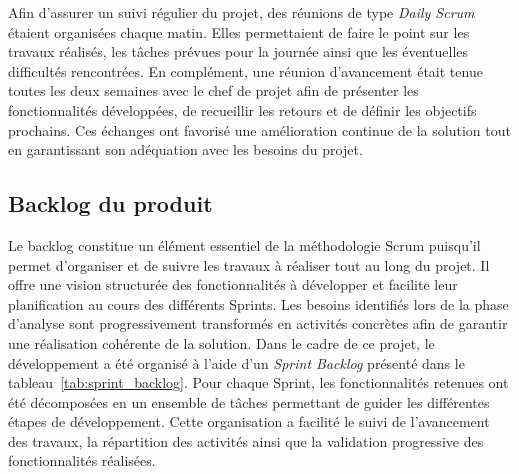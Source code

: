 Afin d'assurer un suivi régulier du projet, des réunions de type \textit{Daily Scrum} étaient organisées chaque matin. Elles permettaient de faire le point sur les travaux réalisés, les tâches prévues pour la journée ainsi que les éventuelles difficultés rencontrées. En complément, une réunion d'avancement était tenue toutes les deux semaines avec le chef de projet afin de présenter les fonctionnalités développées, de recueillir les retours et de définir les objectifs prochains. Ces échanges ont favorisé une amélioration continue de la solution tout en garantissant son adéquation avec les besoins du projet.
 

\subsection{Backlog du produit}

Le backlog constitue un élément essentiel de la méthodologie Scrum puisqu'il permet d'organiser et de suivre les travaux à réaliser tout au long du projet. Il offre une vision structurée des fonctionnalités à développer et facilite leur planification au cours des différents Sprints. Les besoins identifiés lors de la phase d'analyse sont progressivement transformés en activités concrètes afin de garantir une réalisation cohérente de la solution.
Dans le cadre de ce projet, le développement a été organisé à l'aide d'un \textit{Sprint Backlog} présenté dans le tableau~\ref{tab:sprint_backlog}. Pour chaque Sprint, les fonctionnalités retenues ont été décomposées en un ensemble de tâches permettant de guider les différentes étapes de développement. Cette organisation a facilité le suivi de l'avancement des travaux, la répartition des activités ainsi que la validation progressive des fonctionnalités réalisées.


